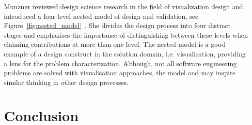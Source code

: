 \documentclass[graybox]{svmult}
\newcommand{\per}[1]{\textcolor{cyan}{{\it [Per says: #1]}}}
\newcommand{\per}[1]{}
\begin{document}
Munzner reviewed design science research in the field of visualization design and introduced a four-level nested model of design and validation, see Figure~\ref{fig:nested_model}~\cite{munzner2009}. She divides the design process into four distinct stages and emphazises the importance of distinguishing between these levels when claiming contributions at more than one level. The nested model is a good example of a design construct in the solution domain, i.e. visualisation, providing a lens for the problem characterization. Although, not all software engineering problems are solved with visualisation approaches, the model and may inspire similar thinking in other design processes. 







\section{Conclusion}
\label{sec:conclusion}




\end{document}
